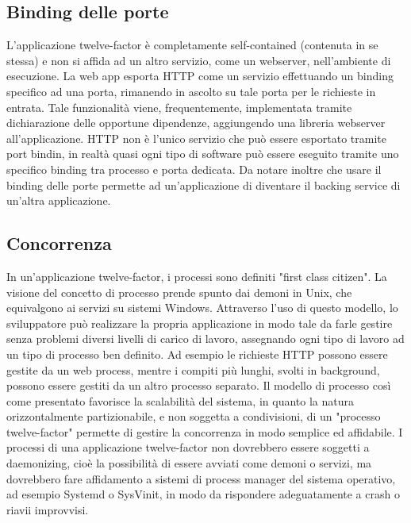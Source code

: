 \documentclass[PianoDiQualifica.tex]{subfiles}
\begin{document}
\subsection{Binding delle porte}
L'applicazione twelve-factor è completamente self-contained (contenuta in se stessa) e non si affida ad un altro servizio, come un webserver, nell'ambiente di esecuzione. La web app esporta HTTP come un servizio effettuando un binding specifico ad una porta, rimanendo in ascolto su tale porta per le richieste in entrata. Tale funzionalità viene, frequentemente, implementata tramite dichiarazione delle opportune dipendenze, aggiungendo una libreria webserver all'applicazione.
HTTP non è l'unico servizio che può essere esportato tramite port bindin, in realtà quasi ogni tipo di software può essere eseguito tramite uno specifico binding tra processo e porta dedicata.
Da notare inoltre che usare il binding delle porte permette ad un'applicazione di diventare il backing service di un'altra applicazione.

\subsection{Concorrenza}
In un'applicazione twelve-factor, i processi sono definiti "first class citizen". La visione del concetto di processo prende spunto dai demoni in Unix, che equivalgono ai servizi su sistemi Windows.
Attraverso l'uso di questo modello, lo sviluppatore può realizzare la propria applicazione in modo tale da farle gestire senza problemi diversi livelli di carico di lavoro, assegnando ogni tipo di lavoro ad un tipo di processo ben definito.
Ad esempio le richieste HTTP possono essere gestite da un web process, mentre i compiti più lunghi, svolti in background, possono essere gestiti da un altro processo separato.
Il modello di processo così come presentato favorisce la scalabilità del sistema, in quanto la natura orizzontalmente partizionabile, e non soggetta a condivisioni, di un "processo twelve-factor" permette di gestire la concorrenza in modo semplice ed affidabile. 
I processi di una applicazione twelve-factor non dovrebbero essere soggetti a daemonizing, cioè la possibilità di essere avviati come demoni o servizi, ma dovrebbero fare affidamento a sistemi di process manager del sistema operativo, ad esempio Systemd o SysVinit, in modo da rispondere adeguatamente a crash o riavii improvvisi.
\end{document}
